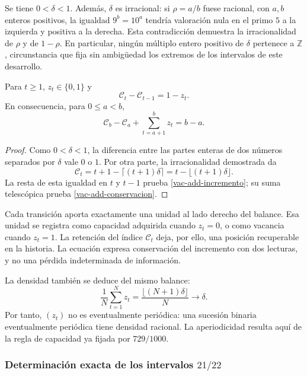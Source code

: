 Se tiene \(0<\delta<1\). Además, \(\delta\) es irracional: si
\(\rho=a/b\) fuese racional, con \(a,b\) enteros positivos, la igualdad
\(9^b=10^a\) tendría valoración nula en el primo \(5\) a la izquierda
y positiva a la derecha. Esta contradicción demuestra la irracionalidad
de \(\rho\) y de \(1-\rho\). En particular, ningún múltiplo entero
positivo de \(\delta\) pertenece a \(\mathbb Z\), circunstancia que
fija sin ambigüedad los extremos de los intervalos de este desarrollo.

\begin{proposition}
\label{vac-add-balance}
Para \(t\geq1\), \(z_t\in\{0,1\}\) y
\begin{equation}
 \mathcal C_t-\mathcal C_{t-1}=1-z_t.
 \label{vac-add-incremento}
\end{equation}
En consecuencia, para \(0\leq a<b\),
\begin{equation}
 \mathcal C_b-\mathcal C_a+
 \sum_{t=a+1}^{b}z_t=b-a.
 \label{vac-add-conservacion}
\end{equation}
\end{proposition}
\begin{proof}
Como \(0<\delta<1\), la diferencia entre las partes enteras de dos
números separados por \(\delta\) vale \(0\) o \(1\). Por otra parte,
la irracionalidad demostrada da
\[
 \mathcal C_t=t+1-\lceil(t+1)\delta\rceil
             =t-\lfloor(t+1)\delta\rfloor.
\]
La resta de esta igualdad en \(t\) y \(t-1\) prueba
\eqref{vac-add-incremento}; su suma telescópica prueba
\eqref{vac-add-conservacion}.
\end{proof}

Cada transición aporta exactamente una unidad al lado derecho del
balance. Esa unidad se registra como capacidad adquirida cuando
\(z_t=0\), o como vacancia cuando \(z_t=1\). La retención del índice
\(\mathcal C_t\) deja, por ello, una posición recuperable en la
historia. La ecuación expresa conservación del incremento con dos
lecturas, y no una pérdida indeterminada de información.

La densidad también se deduce del mismo balance:
\[
 \frac1N\sum_{t=1}^{N}z_t
 =\frac{\lfloor(N+1)\delta\rfloor}{N}\longrightarrow\delta.
\]
Por tanto, \((z_t)\) no es eventualmente periódica: una sucesión binaria
eventualmente periódica tiene densidad racional. La aperiodicidad
resulta aquí de la regla de capacidad ya fijada por \(729/1000\).

\subsubsection{Determinación exacta de los intervalos \(21/22\)}
\label{vac-add-primarios}

